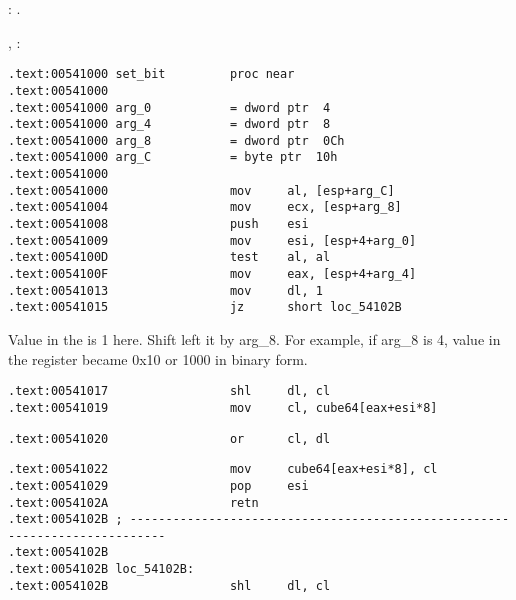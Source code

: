 : .

, :

\begin{lstlisting}
.text:00541000 set_bit         proc near
.text:00541000
.text:00541000 arg_0           = dword ptr  4
.text:00541000 arg_4           = dword ptr  8
.text:00541000 arg_8           = dword ptr  0Ch
.text:00541000 arg_C           = byte ptr  10h
.text:00541000
.text:00541000                 mov     al, [esp+arg_C]
.text:00541004                 mov     ecx, [esp+arg_8]
.text:00541008                 push    esi
.text:00541009                 mov     esi, [esp+4+arg_0]
.text:0054100D                 test    al, al
.text:0054100F                 mov     eax, [esp+4+arg_4]
.text:00541013                 mov     dl, 1
.text:00541015                 jz      short loc_54102B
\end{lstlisting}

{Value in the  is 1 here. Shift left it by arg\_8. For example, if arg\_8 is 4, value in the  register became 
0x10 or 1000 in binary form.}

\begin{lstlisting}
.text:00541017                 shl     dl, cl
.text:00541019                 mov     cl, cube64[eax+esi*8]
\end{lstlisting}


\begin{lstlisting}
.text:00541020                 or      cl, dl
\end{lstlisting}


\begin{lstlisting}
.text:00541022                 mov     cube64[eax+esi*8], cl
.text:00541029                 pop     esi
.text:0054102A                 retn
.text:0054102B ; ---------------------------------------------------------------------------
.text:0054102B
.text:0054102B loc_54102B:
.text:0054102B                 shl     dl, cl
\end{lstlisting}

